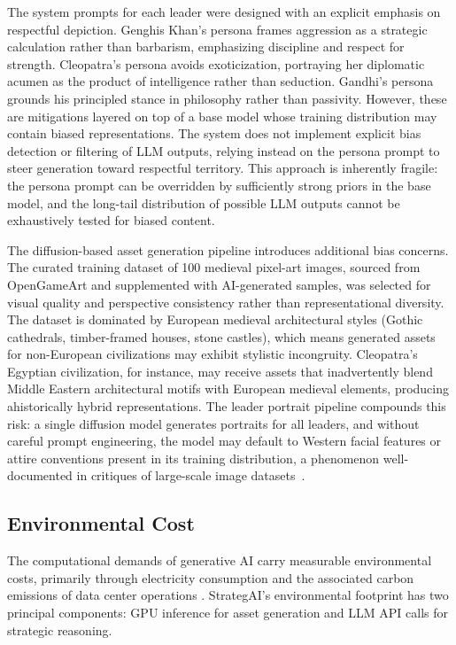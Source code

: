 \documentclass[conference]{IEEEtran}
\begin{document}
The system prompts for each leader were designed with an explicit emphasis on respectful depiction. Genghis Khan's persona frames aggression as a strategic calculation rather than barbarism, emphasizing discipline and respect for strength. Cleopatra's persona avoids exoticization, portraying her diplomatic acumen as the product of intelligence rather than seduction. Gandhi's persona grounds his principled stance in philosophy rather than passivity. However, these are mitigations layered on top of a base model whose training distribution may contain biased representations. The system does not implement explicit bias detection or filtering of LLM outputs, relying instead on the persona prompt to steer generation toward respectful territory. This approach is inherently fragile: the persona prompt can be overridden by sufficiently strong priors in the base model, and the long-tail distribution of possible LLM outputs cannot be exhaustively tested for biased content.

The diffusion-based asset generation pipeline introduces additional bias concerns. The curated training dataset of 100 medieval pixel-art images, sourced from OpenGameArt and supplemented with AI-generated samples, was selected for visual quality and perspective consistency rather than representational diversity. The dataset is dominated by European medieval architectural styles (Gothic cathedrals, timber-framed houses, stone castles), which means generated assets for non-European civilizations may exhibit stylistic incongruity. Cleopatra's Egyptian civilization, for instance, may receive assets that inadvertently blend Middle Eastern architectural motifs with European medieval elements, producing ahistorically hybrid representations. The leader portrait pipeline compounds this risk: a single diffusion model generates portraits for all leaders, and without careful prompt engineering, the model may default to Western facial features or attire conventions present in its training distribution, a phenomenon well-documented in critiques of large-scale image datasets~\cite{crawford2019excavating}.

\subsection{Environmental Cost}

The computational demands of generative AI carry measurable environmental costs, primarily through electricity consumption and the associated carbon emissions of data center operations \cite{strubell2019energy}. StrategAI's environmental footprint has two principal components: GPU inference for asset generation and LLM API calls for strategic reasoning.
\end{document}
